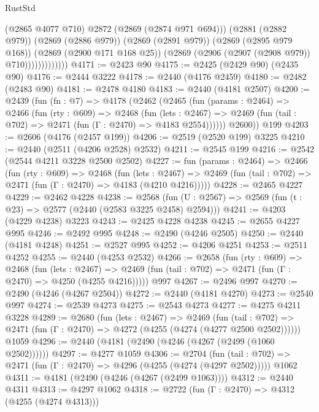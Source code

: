 \begin{lexlean}{RustStd}
\begin{coremodule}
                            (@2865 @4077 @710)
                            @2872
                            (@2869 (@2874 @971 @694)))
                          (@2881 (@2882 @979))
                          (@2869 (@2886 @979))
                          (@2869 (@2891 @979))
                          (@2869 (@2895 @979 @168))
                          (@2869 (@2900 @171 @168 @25))
                          (@2869 (@2906 (@2907 (@2908 @979)) @710)))))))))))))
@4171 := @2423 @90
@4175 := @2425 (@2429 @90) (@2435 @90)
@4176 := @2444 @3222
@4178 := @2440 (@4176 @2459)
@4180 := @2482 (@2483 @90)
@4181 := @2478 @4180
@4183 := @2440 (@4181 @2507)
@4200 := @2439
    (fun (fn : @7) =>
    @4178
      (@2462
        (@2465
          (fun (params : @2464) =>
          @2466
            (fun (rty : @609) =>
            @2468
              (fun (lets : @2467) =>
              @2469 (fun (tail : @702) => @2471 (fun (Γ : @2470) => @4183 @2554))))))
        @2600))
    @199
@4203 := @2606 (@4176 (@2457 @199))
@4206 := @2519 (@2520 @199) @3225
@4210 := @2440 (@2511 (@4206 @2528) @2532)
@4211 := @2545 @199
@4216 := @2542 (@2544 @4211 @3228 @2500 @2502)
@4227 := fun (params : @2464) =>
  @2466
    (fun (rty : @609) =>
    @2468
      (fun (lets : @2467) =>
      @2469 (fun (tail : @702) => @2471 (fun (Γ : @2470) => @4183 (@4210 @4216)))))
@4228 := @2465 @4227
@4229 := @2462 @4228
@4238 := @2568 (fun (U : @2567) => @2569 (fun (t : @23) => @2577 (@2440 (@2583 @3225 @2458) @2594)))
@4241 := @4203 (@4229 @4238) @3223
@4243 := @2425 @4228 @4238
@4245 := @2655 @4227 @995
@4246 := @2492 @995
@4248 := @2490 (@4246 @2505)
@4250 := @2440 (@4181 @4248)
@4251 := @2527 @995
@4252 := @4206 @4251
@4253 := @2511 @4252
@4255 := @2440 (@4253 @2532)
@4266 := @2658
    (fun (rty : @609) =>
    @2468
      (fun (lets : @2467) =>
      @2469 (fun (tail : @702) => @2471 (fun (Γ : @2470) => @4250 (@4255 @4216)))))
    @997
@4267 := @2496 @997
@4270 := @2490 (@4246 (@4267 @2504))
@4272 := @2440 (@4181 @4270)
@4273 := @2540 @997
@4274 := @2539 @4273
@4275 := @2543 @4273
@4277 := @4275 @4211 @3228
@4289 := @2680
    (fun (lets : @2467) =>
    @2469
      (fun (tail : @702) => @2471 (fun (Γ : @2470) => @4272 (@4255 (@4274 (@4277 @2500 @2502))))))
    @1059
@4296 := @2440 (@4181 (@2490 (@4246 (@4267 (@2499 (@1060 @2502))))))
@4297 := @4277 @1059
@4306 := @2704
    (fun (tail : @702) => @2471 (fun (Γ : @2470) => @4296 (@4255 (@4274 (@4297 @2502)))))
    @1062
@4311 := @4181 (@2490 (@4246 (@4267 (@2499 @1063))))
@4312 := @2440 @4311
@4313 := @4297 @1062
@4318 := @2722 (fun (Γ : @2470) => @4312 (@4255 (@4274 @4313)))

\end{coremodule}
\end{lexlean}
